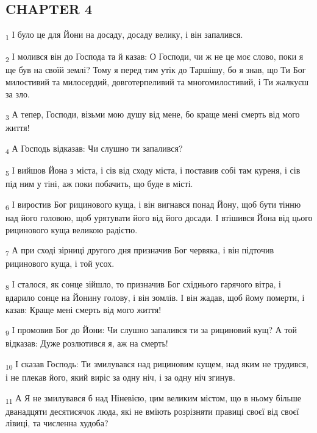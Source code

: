 \subsection{CHAPTER 4}
\begin{tcolorbox}
\textsubscript{1} І було це для Йони на досаду, досаду велику, і він запалився.
\end{tcolorbox}
\begin{tcolorbox}
\textsubscript{2} І молився він до Господа та й казав: О Господи, чи ж не це моє слово, поки я ще був на своїй землі? Тому я перед тим утік до Таршішу, бо я знав, що Ти Бог милостивий та милосердий, довготерпеливий та многомилостивий, і Ти жалкуєш за зло.
\end{tcolorbox}
\begin{tcolorbox}
\textsubscript{3} А тепер, Господи, візьми мою душу від мене, бо краще мені смерть від мого життя!
\end{tcolorbox}
\begin{tcolorbox}
\textsubscript{4} А Господь відказав: Чи слушно ти запалився?
\end{tcolorbox}
\begin{tcolorbox}
\textsubscript{5} І вийшов Йона з міста, і сів від сходу міста, і поставив собі там куреня, і сів під ним у тіні, аж поки побачить, що буде в місті.
\end{tcolorbox}
\begin{tcolorbox}
\textsubscript{6} І виростив Бог рицинового куща, і він вигнався понад Йону, щоб бути тінню над його головою, щоб урятувати його від його досади. І втішився Йона від цього рицинового куща великою радістю.
\end{tcolorbox}
\begin{tcolorbox}
\textsubscript{7} А при сході зірниці другого дня призначив Бог червяка, і він підточив рицинового куща, і той усох.
\end{tcolorbox}
\begin{tcolorbox}
\textsubscript{8} І сталося, як сонце зійшло, то призначив Бог східнього гарячого вітра, і вдарило сонце на Йонину голову, і він зомлів. І він жадав, щоб йому померти, і казав: Краще мені смерть від мого життя!
\end{tcolorbox}
\begin{tcolorbox}
\textsubscript{9} І промовив Бог до Йони: Чи слушно запалився ти за рициновий кущ? А той відказав: Дуже розлютився я, аж на смерть!
\end{tcolorbox}
\begin{tcolorbox}
\textsubscript{10} І сказав Господь: Ти змилувався над рициновим кущем, над яким не трудився, і не плекав його, який виріс за одну ніч, і за одну ніч згинув.
\end{tcolorbox}
\begin{tcolorbox}
\textsubscript{11} А Я не змилувався б над Ніневією, цим великим містом, що в ньому більше дванадцяти десятисячок люда, які не вміють розрізняти правиці своєї від своєї лівиці, та численна худоба?
\end{tcolorbox}
